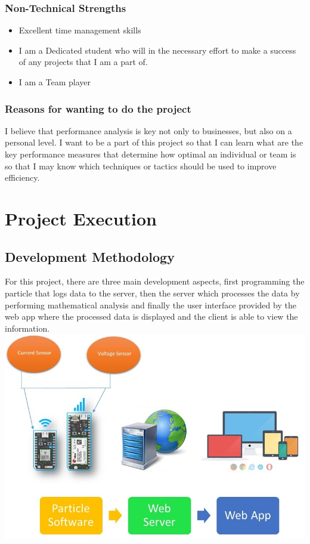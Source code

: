 \documentclass{scrartcl}
\begin{document}
\subsubsection{Non-Technical Strengths}
\begin{itemize}
    \item Excellent time management skills
    \item I am a Dedicated student who will in the necessary effort to make a success of any projects that I am a part of.
    \item I am a Team player
\end{itemize}
\subsubsection{Reasons for wanting to do the project}
I believe that performance analysis is key not only to businesses, but also on a personal level. I want to be a part of this project so that I can learn what are the key performance measures that determine how optimal an 
individual or team is so that I may know which techniques or tactics should be used to improve efficiency.
\newpage
\section{Project Execution}
\subsection{Development Methodology}
For this project, there are three main development aspects, first programming the particle that logs data to the server, then the server which processes the data by performing mathematical analysis and finally the user interface provided by the web app where the processed data is displayed and the client is able to view the information.\\
\includegraphics[width=\textwidth]{pcDevMeth.jpg}
\end{document}
